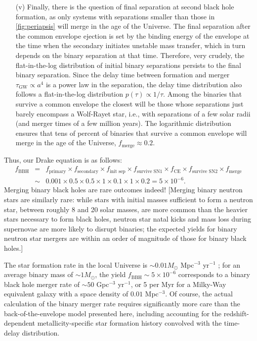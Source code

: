 \documentclass[iop,onecolumn]{revtex4-1}
\begin{document}
\begin{enumerate}
\item[(v)]  Finally, there is the question of final separation at second black hole formation, as only systems with separations smaller than those in \autoref{fig:periapsis} will merge in the age of the Universe.  The final separation after the common envelope ejection is set by the binding energy of the envelope at the time when the secondary initiates unstable mass transfer, which in turn depends on the binary separation at that time.  Therefore, very crudely, the flat-in-the-log distribution of initial binary separations persists to the final binary separation.  Since the delay time between formation and merger $\tau_\textrm{GW} \propto a^4$ is a power law in the separation, the delay time distribution also follows a flat-in-the-log distribution $p(\tau) \propto 1/\tau$.  Among the binaries that survive a common envelope the closest will be those whose separations just barely encompass a Wolf-Rayet star, i.e., with separations of a few solar radii (and merger times of a few million years).  The logarithmic distribution ensures that tens of percent of binaries that survive a common envelope will merge in the age of the Universe, $f_\textrm{merge} \approx 0.2$.
\end{enumerate}

Thus, our Drake equation is as follows:
\begin{eqnarray}
f_\textrm{BBH} &=& f_\textrm{primary} \times f_\textrm{secondary} \times f_\textrm{init sep} \times f_\textrm{survive SN1} \times f_\textrm{CE} \times f_\textrm{survive SN2} \times f_\textrm{merge} \nonumber \\
 & \sim & 0.001 \times 0.5 \times 0.5 \times 1 \times 0.1 \times 1 \times 0.2 = 5 \times 10^{-6}.
\end{eqnarray}
Merging binary black holes are rare outcomes indeed!  [Merging binary neutron stars are similarly rare: while stars with initial masses sufficient to form a neutron star, between roughly 8 and 20 solar masses, are more common than the heavier stars necessary to form black holes, neutron star natal kicks and mass loss during supernovae are more likely to disrupt binaries; the expected yields for binary neutron star mergers are within an order of magnitude of those for binary black holes.]

The star formation rate in the local Universe is $\sim 0.01 M_\odot$ Mpc$^{-3}$ yr$^{-1}$ \citep{MadauDickinson:2014}; for an average binary mass of $\sim 1 M_\odot$, the yield $f_\textrm{BBH} \sim 5 \times 10^{-6}$ corresponds to a binary black hole merger rate of $\sim 50$ Gpc$^{-3}$ yr$^{-1}$, or 5 per Myr for a Milky-Way equivalent galaxy with a space density of $0.01$ Mpc$^{-3}$.  Of course, the actual calculation of the binary merger rate requires significantly more care than the back-of-the-envelope model presented here, including accounting for the redshift-dependent metallicity-specific star formation history convolved with the time-delay distribution.  
\end{document}

